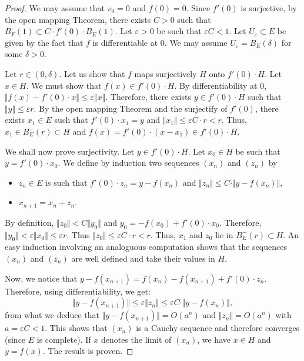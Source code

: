 \documentclass{amsart}
\begin{document}
\begin{proof}
We may assume that $v_0=0$ and $f(0)=0$. Since $f'(0)$ is surjective, by 
the open mapping Theorem, there exists $C>0$ such that $B_F(1) \subset 
C \cdot f'(0) \cdot B_E(1)$. Let $\varepsilon>0$ be such that 
$\varepsilon C < 1$. Let $U_\varepsilon \subset E$ be given by the fact 
that $f$ is differentiable at $0$. We may assume $U_\varepsilon = 
B_E(\delta)$ for some $\delta >0$.

Let $r \in (0, \delta)$.
Let us show that $f$ maps surjectively $H$ onto $f'(0) \cdot H$.
Let $x \in H$. We must show that $f(x) \in f'(0) \cdot H$. 
By differentiability at $0$, $\Vert f(x)-f'(0) \cdot x \Vert \leq 
\varepsilon \Vert x \Vert $. Therefore, there exists $y \in f'(0) \cdot 
H$ such that 
$\Vert y \Vert \leq \varepsilon r$. By the open mapping Theorem and the 
surjectify of $f'(0)$, there exists $x_1 \in E$ such that $f'(0) \cdot 
x_1 =y$ and $\Vert x_1 \Vert \leq \varepsilon C \cdot r < r$. Thus, $x_1 
\in B^-_E(r) \subset H$ and $f(x)= f'(0) \cdot (x-x_1) \in f'(0) 
\cdot H$.

We shall now prove surjectivity. Let $y \in f'(0) \cdot H$. 
Let $x_0 \in H$ be such that $y = f'(0) \cdot x_0$.
We define by induction two sequences $(x_n)$ and $(z_n)$ by
\begin{itemize}
\item $z_n \in E$ is such that
$f'(0) \cdot z_n = y - f(x_n)$ and
$\Vert z_n \Vert \leq C \cdot \Vert y - f(x_n) \Vert$,
\item $x_{n+1}=x_n+z_n$.
\end{itemize}
By definition, $\Vert z_0 \Vert < C \Vert y_0\Vert$ and $y_0 
= -f(x_0)+f'(0) \cdot x_0$. Therefore, $\Vert y_0 \Vert < \varepsilon 
\Vert x_0 \Vert \leq \varepsilon r$. Thus $\Vert z_0 \Vert \leq 
\varepsilon C \cdot r < r$. Thus, $x_1$ and $z_0$ lie in $B^-_E(r) 
\subset H$. An easy induction involving an analoguous computation
shows that the sequences $(x_n)$ and $(z_n)$ are well defined and
take their values in $H$.

Now, we notice that
$y - f(x_{n+1}) = f(x_n) - f(x_{n+1}) + f'(0) \cdot z_n$.
Therefore, using differentiability, we get:
$$\Vert y  - f(x_{n+1}) \Vert 
\leq \varepsilon \Vert z_n \Vert \leq \varepsilon C \cdot \Vert 
y - f(x_n) \Vert,$$
from what we deduce that $\Vert y - f(x_{n+1}) \Vert = 
O(a^n)$ and $\Vert z_n \Vert = O(a^n)$ with $a = \varepsilon C < 1$.
This shows that $(x_n)$ is a Cauchy sequence and therefore converges 
(since $E$ is complete). If $x$ denotes the limit of $(x_n)$, we have
$x \in H$ and $y=f(x)$. The result is proven.
\end{proof}
\end{document}
